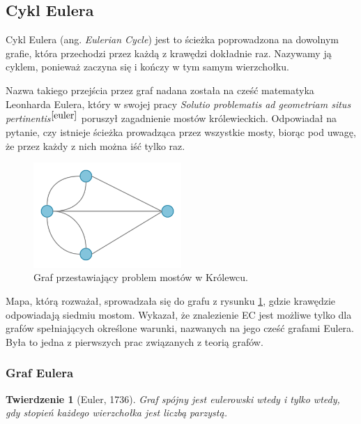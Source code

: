 \documentclass[a4paper, 12pt, twoside, openright]{article}
\newtheorem{theorem}{Twierdzenie}
\begin{document}
\subsection{Cykl Eulera} \label{SciezkaEulera}

\indent\par
	Cykl Eulera (ang. \textit{Eulerian Cycle}) jest to ścieżka poprowadzona na dowolnym grafie, która przechodzi przez każdą z krawędzi dokładnie raz. Nazywamy ją cyklem, ponieważ zaczyna się i kończy w tym samym wierzchołku. 
	
	Nazwa takiego przejścia przez graf nadana została na cześć matematyka Leonharda Eulera, który w swojej pracy \textit{Solutio problematis ad geometriam situs pertinentis}$^{\cite{euler}}$ poruszył zagadnienie mostów królewieckich. Odpowiadał na pytanie, czy istnieje ścieżka prowadząca przez wszystkie mosty, biorąc pod uwagę, że przez każdy z nich można iść tylko raz. 
	
	\begin{figure}[H]
		\centering
		\includegraphics[width=0.5\textwidth]{img/wstep/w1}
		\caption[]{Graf przestawiający problem mostów w Królewcu\footnotemark.}
		\label{krolewiec}
	\end{figure}
	
	Mapa, którą rozważał, sprowadzała się do grafu z rysunku \ref{krolewiec}, gdzie krawędzie odpowiadają siedmiu mostom. Wykazał, że znalezienie EC jest możliwe tylko dla grafów spełniających określone warunki, nazwanych na jego cześć grafami Eulera. Była to jedna z pierwszych prac związanych z teorią grafów.
	
	\subsubsection{Graf Eulera} \label{grafEulera}
	\begin{theorem}[Euler, 1736]
		\label{twEuleraUG}
		Graf spójny jest eulerowski wtedy i tylko wtedy, gdy
		stopień każdego wierzchołka jest liczbą parzystą.	
	\end{theorem}
\end{document}
